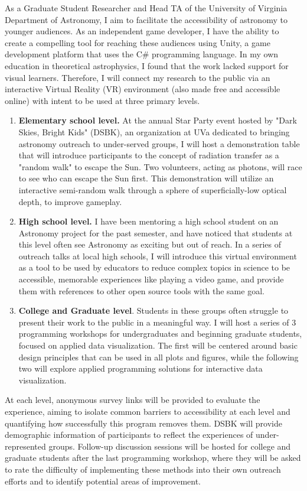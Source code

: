 \documentclass[11pt]{article}
\begin{document}
As a Graduate Student Researcher and Head TA of the University of Virginia Department of Astronomy, I aim to facilitate the accessibility of astronomy to younger audiences. As an independent game developer, I have the ability to create a compelling tool for reaching these audiences using Unity, a game development platform that uses the C\# programming language. In my own education in theoretical astrophysics, I found that the work lacked support for visual learners. Therefore, I will connect my research to the public via an interactive Virtual Reality (VR) environment (also made free and accessible online) with intent to be used at three primary levels.
\begin{enumerate}[itemsep=-0.15cm, topsep=0cm]
    \item \textbf{Elementary school level.} At the annual Star Party event hosted by "Dark Skies, Bright Kids" (DSBK), an organization at UVa dedicated to bringing astronomy outreach to under-served groups, I will host a demonstration table that will introduce participants to the concept of radiation transfer as a "random walk" to escape the Sun. Two volunteers, acting as photons, will race to see who can escape the Sun first. This demonstration will utilize an interactive semi-random walk through a sphere of superficially-low optical depth, to improve gameplay.
    \item \textbf{High school level.} I have been mentoring a high school student on an Astronomy project for the past semester, and have noticed that students at this level often see Astronomy as exciting but out of reach. In a series of outreach talks at local high schools, I will introduce this virtual environment as a tool to be used by educators to reduce complex topics in science to be accessible, memorable experiences like playing a video game, and provide them with references to other open source tools with the same goal.
    \item \textbf{College and Graduate level}. Students in these groups often struggle to present their work to the public in a meaningful way. I will host a series of 3 programming workshops for undergraduates and beginning graduate students, focused on applied data visualization. The first will be centered around basic design principles that can be used in all plots and figures, while the following two will explore applied programming solutions for interactive data visualization.
\end{enumerate}
At each level, anonymous survey links will be provided to evaluate the experience, aiming to isolate common barriers to accessibility at each level and quantifying how successfully this program removes them. DSBK will provide demographic information of participants to reflect the experiences of under-represented groups. Follow-up discussion sessions will be hosted for college and graduate students after the last programming workshop, where they will be asked to rate the difficulty of implementing these methods into their own outreach efforts and to identify potential areas of improvement.

\renewcommand\refname{\vskip -1cm}


\end{document}
